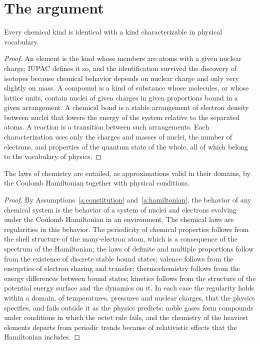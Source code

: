\documentclass{situationist-preprint}
\begin{document}
\section{The argument}

\begin{lemma}[Kinds]\label{l:kinds}
Every chemical kind is identical with a kind characterizable in physical vocabulary.
\end{lemma}

\begin{proof}
An element is the kind whose members are atoms with a given nuclear charge; IUPAC defines it so, and the identification survived the discovery of isotopes because chemical behavior depends on nuclear charge and only very slightly on mass. A compound is a kind of substance whose molecules, or whose lattice units, contain nuclei of given charges in given proportions bound in a given arrangement. A chemical bond is a stable arrangement of electron density between nuclei that lowers the energy of the system relative to the separated atoms. A reaction is a transition between such arrangements. Each characterization uses only the charges and masses of nuclei, the number of electrons, and properties of the quantum state of the whole, all of which belong to the vocabulary of physics.
\end{proof}

\begin{lemma}[Laws]\label{l:laws}
The laws of chemistry are entailed, as approximations valid in their domains, by the Coulomb Hamiltonian together with physical conditions.
\end{lemma}

\begin{proof}
By Assumptions~\ref{a:constitution} and~\ref{a:hamiltonian}, the behavior of any chemical system is the behavior of a system of nuclei and electrons evolving under the Coulomb Hamiltonian in an environment. The chemical laws are regularities in this behavior. The periodicity of chemical properties follows from the shell structure of the many-electron atom, which is a consequence of the spectrum of the Hamiltonian; the laws of definite and multiple proportions follow from the existence of discrete stable bound states; valence follows from the energetics of electron sharing and transfer; thermochemistry follows from the energy differences between bound states; kinetics follows from the structure of the potential energy surface and the dynamics on it. In each case the regularity holds within a domain, of temperatures, pressures and nuclear charges, that the physics specifies, and fails outside it as the physics predicts: noble gases form compounds under conditions in which the octet rule fails, and the chemistry of the heaviest elements departs from periodic trends because of relativistic effects that the Hamiltonian includes.
\end{proof}
\end{document}
